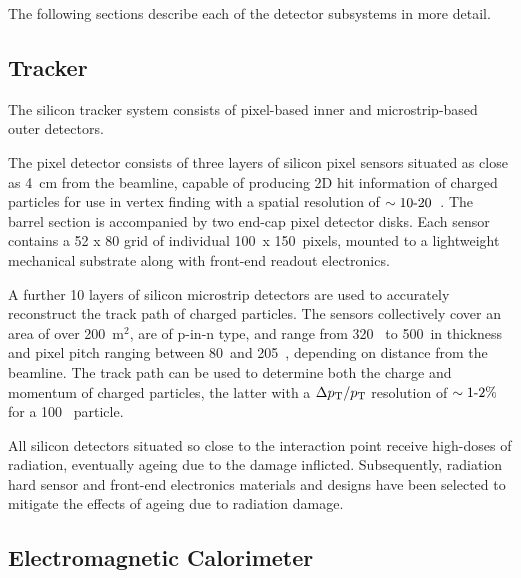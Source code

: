 The following sections describe each of the detector subsystems in more detail.

\subsection{Tracker}



The silicon tracker system consists of pixel-based inner and microstrip-based
outer detectors.

The pixel detector consists of three layers of silicon pixel sensors situated 
as close as 4~cm from the beamline, capable 
of producing 2D hit information of charged particles for use in vertex 
finding with a spatial resolution of $\sim 10 {\hbox{-}} 20$~\microm. The barrel section
is accompanied by two end-cap pixel detector
disks. Each sensor contains a 52 x 80 grid of individual 100~\microm x
150~\microm pixels,
mounted to a lightweight mechanical substrate along with front-end readout 
electronics.

A further 10 layers of silicon microstrip detectors are used to accurately 
reconstruct the track path of charged particles. The sensors collectively cover 
an area of over 200~$\text{m}^2$, are of p-in-n type, and range from 320~\microm
to 500~\microm in thickness and pixel pitch ranging between 80~\microm and 
205~\microm, depending on distance from the beamline. The track path can be used
to determine both the charge and momentum of charged particles, the latter with
a $\Delta {p_{\text T}}/{p_{\text T}}$ resolution of $\sim 1 {\hbox{-}} 2 \%$ for a 100~\gev
particle.

All silicon detectors situated so close to the interaction point receive
high-doses of radiation, eventually ageing due to the damage inflicted. Subsequently, 
radiation hard sensor and front-end electronics materials and designs have been
selected to mitigate the effects of ageing due to radiation damage.

\subsection{Electromagnetic Calorimeter}

